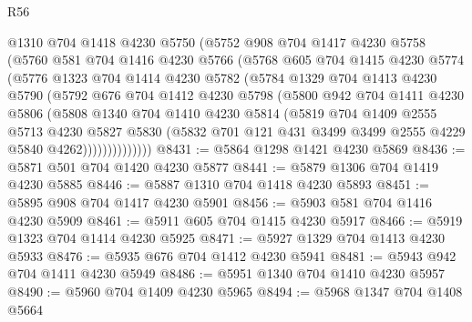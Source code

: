 \begin{lexlean}{R56}
\begin{coremodule}
            @1310
            @704
            @1418
            @4230
            @5750
            (@5752
              @908
              @704
              @1417
              @4230
              @5758
              (@5760
                @581
                @704
                @1416
                @4230
                @5766
                (@5768
                  @605
                  @704
                  @1415
                  @4230
                  @5774
                  (@5776
                    @1323
                    @704
                    @1414
                    @4230
                    @5782
                    (@5784
                      @1329
                      @704
                      @1413
                      @4230
                      @5790
                      (@5792
                        @676
                        @704
                        @1412
                        @4230
                        @5798
                        (@5800
                          @942
                          @704
                          @1411
                          @4230
                          @5806
                          (@5808
                            @1340
                            @704
                            @1410
                            @4230
                            @5814
                            (@5819
                              @704
                              @1409
                              @2555
                              @5713
                              @4230
                              @5827
                              @5830
                              (@5832
                                @701
                                @121
                                @431
                                @3499
                                @3499
                                @2555
                                @4229
                                @5840
                                @4262))))))))))))))
@8431 := @5864 @1298 @1421 @4230 @5869
@8436 := @5871 @501 @704 @1420 @4230 @5877
@8441 := @5879 @1306 @704 @1419 @4230 @5885
@8446 := @5887 @1310 @704 @1418 @4230 @5893
@8451 := @5895 @908 @704 @1417 @4230 @5901
@8456 := @5903 @581 @704 @1416 @4230 @5909
@8461 := @5911 @605 @704 @1415 @4230 @5917
@8466 := @5919 @1323 @704 @1414 @4230 @5925
@8471 := @5927 @1329 @704 @1413 @4230 @5933
@8476 := @5935 @676 @704 @1412 @4230 @5941
@8481 := @5943 @942 @704 @1411 @4230 @5949
@8486 := @5951 @1340 @704 @1410 @4230 @5957
@8490 := @5960 @704 @1409 @4230 @5965
@8494 := @5968 @1347 @704 @1408 @5664

\end{coremodule}
\end{lexlean}
